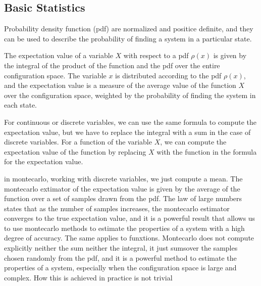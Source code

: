 \subsection{Basic Statistics}

Probability density function (pdf) are normalized and positice definite, and they can be used to describe the probability of finding a system in a particular state.

The expectation value of a variable \(X\) with respect to a pdf \(\rho(x)\) is given by the integral of the product of the function and the pdf over the entire configuration space. The variable \(x\) is distributed according to the pdf \(\rho(x)\), and the expectation value is a measure of the average value of the function \(X\) over the configuration space, weighted by the probability of finding the system in each state.

For continuous or discrete variables, we can use the same formula to compute the expectation value, but we have to replace the integral with a sum in the case of discrete variables. For a function of the variable \(X\), we can compute the expectation value of the function by replacing \(X\) with the function in the formula for the expectation value.

in montecarlo, working with discrete variables, we just compute a mean. The montecarlo extimator of the expectation value is given by the average of the function over a set of samples drawn from the pdf. The law of large numbers states that as the number of samples increases, the montecarlo estimator converges to the true expectation value, and it is a powerful result that allows us to use montecarlo methods to estimate the properties of a system with a high degree of accuracy. The same applies to funxtions. Montecarlo does not compute explicitly neither the sum neither the integral, it just sumsover the samples chosen randomly from the pdf, and it is a powerful method to estimate the properties of a system, especially when the configuration space is large and complex. How this is achieved in practice is not trivial

